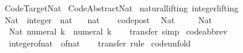 %
\begin{isabellebody}%
%
%
\isamarkuptrue%
%
\isadelimtheory
%
\endisadelimtheory
%
\isatagtheory
{}\isamarkupfalse%
\ Code{\isacharunderscore}Target{\isacharunderscore}Nat\isanewline
{}\ Code{\isacharunderscore}Abstract{\isacharunderscore}Nat\isanewline
{}%
\endisatagtheory
{\isafoldtheory}%
%
\isadelimtheory
%
\endisadelimtheory
%
\isamarkuptrue%
\isamarkupfalse%
\isanewline
{}\ natural{\isachardot}lifting\ integer{\isachardot}lifting\isanewline
{}\isanewline
\isanewline
{}\isamarkupfalse%
\ Nat\ {\isacharcolon}{\isacharcolon}\ {\isachardoublequoteopen}integer\ {\isasymRightarrow}\ nat{\isachardoublequoteclose}\isanewline
\ \ \ nat\isanewline
%
\isadelimproof
\ \ %
\endisadelimproof
%
\isatagproof
\isacommand{{\isachardot}}\isamarkupfalse%
%
\endisatagproof
{\isafoldproof}%
%
\isadelimproof
\isanewline
%
\endisadelimproof
\isanewline
{}\isamarkupfalse%
\ {\isacharbrackleft}code{\isacharunderscore}post{\isacharbrackright}{\isacharcolon}\isanewline
\ \ {\isachardoublequoteopen}Nat\ {}\ {\isacharequal}\ {}{\isachardoublequoteclose}\isanewline
\ \ {\isachardoublequoteopen}Nat\ {}\ {\isacharequal}\ {}{\isachardoublequoteclose}\isanewline
\ \ {\isachardoublequoteopen}Nat\ {\isacharparenleft}numeral\ k{\isacharparenright}\ {\isacharequal}\ numeral\ k{\isachardoublequoteclose}\isanewline
%
\isadelimproof
\ \ %
\endisadelimproof
%
\isatagproof
{}\isamarkupfalse%
\ {\isacharparenleft}transfer{\isacharcomma}\ simp{\isacharparenright}{\isacharplus}%
\endisatagproof
{\isafoldproof}%
%
\isadelimproof
\isanewline
%
\endisadelimproof
\isanewline
{}\isamarkupfalse%
\ {\isacharbrackleft}code{\isacharunderscore}abbrev{\isacharbrackright}{\isacharcolon}\isanewline
\ \ {\isachardoublequoteopen}integer{\isacharunderscore}of{\isacharunderscore}nat\ {\isacharequal}\ of{\isacharunderscore}nat{\isachardoublequoteclose}\isanewline
%
\isadelimproof
\ \ %
\endisadelimproof
%
\isatagproof
{}\isamarkupfalse%
\ transfer\ rule%
\endisatagproof
{\isafoldproof}%
%
\isadelimproof
\isanewline
%
\endisadelimproof
\isanewline
{}\isamarkupfalse%
\ {\isacharbrackleft}code{\isacharunderscore}unfold{\isacharbrackright}{\isacharcolon}\isanewline

\end{isabellebody}
